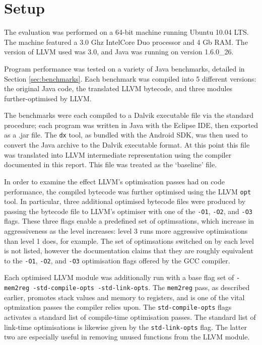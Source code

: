 \section{Setup}
\label{sec:setup}

The evaluation was performed on a 64-bit machine running Ubuntu 10.04 LTS. The machine featured a 3.0 Ghz Intel\textregistered Core Duo processor and 4 Gb RAM. The version of LLVM used was 3.0, and Java was running on version 1.6.0\_26.

Program performance was tested on a variety of Java benchmarks, detailed in Section \ref{sec:benchmarks}. Each benchmark was compiled into 5 different versions: the original Java code, the translated LLVM bytecode, and three modules further-optimised by LLVM. 

The benchmarks were each compiled to a Dalvik executable file via the standard procedure; each program was written in Java with the Eclipse IDE, then exported as a .jar file. The \verb|dx| tool, as bundled with the Android SDK, was then used to convert the Java archive to the Dalvik executable format. At this point this file was translated into LLVM intermediate representation using the compiler documented in this report. This file was treated as the `baseline' file. 

In order to examine the effect LLVM's optimisation passes had on code performance, the compiled bytecode was further optimised using the LLVM \verb|opt| tool. In particular, three additional optimised bytecode files were produced by passing the bytecode file to LLVM's optimiser with one of the \verb|-O1|, \verb|-O2|, and \verb|-O3| flags. These three flags enable a predefined set of optimsations, which increase in aggressiveness as the level increases: level 3 runs more aggressive optimisations than level 1 does, for example. The set of optimsations switched on by each level is not listed, however the documentation claims that they are roughly equivalent to the \verb|-O1|, \verb|-O2|, and \verb|-O3| optimisation flags offered by the GCC compiler.

Each optimised LLVM module was additionally run with a base flag set of \verb|-mem2reg -std-compile-opts -std-link-opts|. The \verb|mem2reg| pass, as described earlier, promotes stack values and memory to registers, and is one of the vital optmization passes the compiler relies upon. The \verb|std-compile-opts| flags activates a standard list of compile-time optimisation passes. The standard list of link-time optimisations is likewise given by the \verb|std-link-opts| flag. The latter two are especially useful in removing unused functions from the LLVM module.

